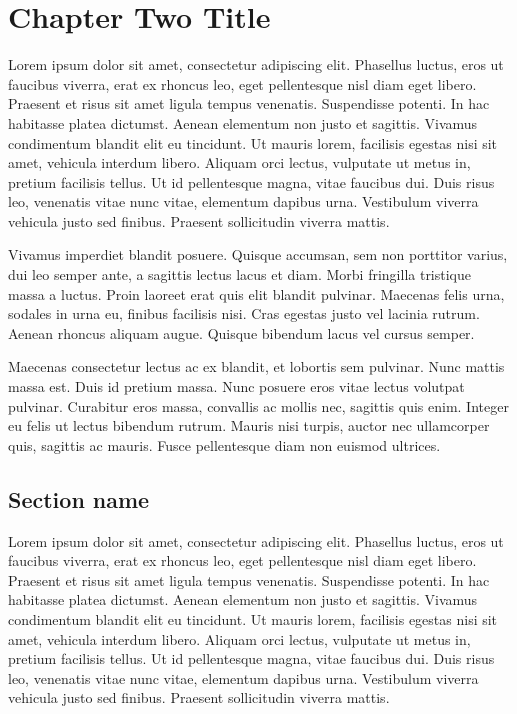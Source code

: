 \chapter{Chapter Two Title}
Lorem ipsum dolor sit amet, consectetur adipiscing elit. Phasellus luctus, eros ut faucibus viverra, erat ex rhoncus leo, eget pellentesque nisl diam eget libero. Praesent et risus sit amet ligula tempus venenatis. Suspendisse potenti. In hac habitasse platea dictumst. Aenean elementum non justo et sagittis. Vivamus condimentum blandit elit eu tincidunt. Ut mauris lorem, facilisis egestas nisi sit amet, vehicula interdum libero. Aliquam orci lectus, vulputate ut metus in, pretium facilisis tellus. Ut id pellentesque magna, vitae faucibus dui. Duis risus leo, venenatis vitae nunc vitae, elementum dapibus urna. Vestibulum viverra vehicula justo sed finibus. Praesent sollicitudin viverra mattis.

Vivamus imperdiet blandit posuere. Quisque accumsan, sem non porttitor varius, dui leo semper ante, a sagittis lectus lacus et diam. Morbi fringilla tristique massa a luctus. Proin laoreet erat quis elit blandit pulvinar. Maecenas felis urna, sodales in urna eu, finibus facilisis nisi. Cras egestas justo vel lacinia rutrum. Aenean rhoncus aliquam augue. Quisque bibendum lacus vel cursus semper.

Maecenas consectetur lectus ac ex blandit, et lobortis sem pulvinar. Nunc mattis massa est. Duis id pretium massa. Nunc posuere eros vitae lectus volutpat pulvinar. Curabitur eros massa, convallis ac mollis nec, sagittis quis enim. Integer eu felis ut lectus bibendum rutrum. Mauris nisi turpis, auctor nec ullamcorper quis, sagittis ac mauris. Fusce pellentesque diam non euismod ultrices. 

\section{Section name}
Lorem ipsum dolor sit amet, consectetur adipiscing elit. Phasellus luctus, eros ut faucibus viverra, erat ex rhoncus leo, eget pellentesque nisl diam eget libero. Praesent et risus sit amet ligula tempus venenatis. Suspendisse potenti. In hac habitasse platea dictumst. Aenean elementum non justo et sagittis. Vivamus condimentum blandit elit eu tincidunt. Ut mauris lorem, facilisis egestas nisi sit amet, vehicula interdum libero. Aliquam orci lectus, vulputate ut metus in, pretium facilisis tellus. Ut id pellentesque magna, vitae faucibus dui. Duis risus leo, venenatis vitae nunc vitae, elementum dapibus urna. Vestibulum viverra vehicula justo sed finibus. Praesent sollicitudin viverra mattis.

